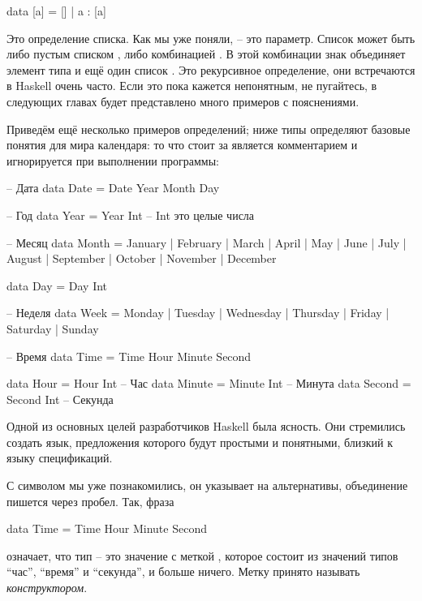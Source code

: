 \begin{code}
data [a] = [] | a : [a]
\end{code}

Это определение списка. Как мы уже поняли,  -- это параметр.
Список \In{[a]} может быть либо пустым списком \In{[]}, либо комбинацией
. В этой комбинации знак \In{:} объединяет элемент типа
 и ещё один список \In{[a]}. Это рекурсивное определение, они
встречаются в Haskell очень часто. Если это пока кажется непонятным, не
пугайтесь, в следующих главах будет представлено много примеров с
пояснениями.

Приведём ещё несколько примеров определений; ниже типы определяют
базовые понятия для мира календаря: то что стоит за \In{--} является
комментарием и игнорируется при выполнении программы:


\begin{code}
-- Дата
data Date = Date Year Month Day

-- Год
data Year  = Year Int       -- Int это целые числа

-- Месяц
data Month  = January    | February   | March    | April          
            | May        | June       | July     | August   
            | September  | October    | November | December 

data Day = Day Int

-- Неделя
data Week  = Monday     | Tuesday   | Wednesday 
           | Thursday   | Friday    | Saturday     
           | Sunday     

-- Время
data Time = Time Hour Minute Second

data Hour   = Hour   Int    -- Час
data Minute = Minute Int    -- Минута
data Second = Second Int    -- Секунда
\end{code}

Одной из основных целей разработчиков Haskell была ясность. Они
стремились создать язык, предложения которого будут простыми и
понятными, близкий к языку спецификаций.

С символом \In{|} мы уже познакомились, он указывает на альтернативы,
объединение пишется через пробел. Так, фраза


\begin{code}
data Time = Time Hour Minute Second
\end{code}

означает, что тип  -- это значение с меткой , которое
состоит из значений типов ``час'', ``время'' и ``секунда'', и больше
ничего. Метку принято называть \emph{конструктором}.


